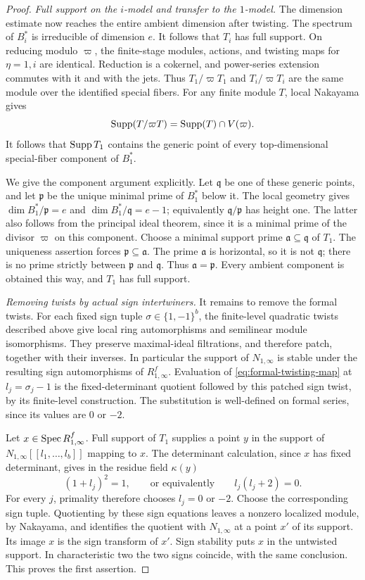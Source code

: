 \begin{proof}
\emph{Full support on the \(i\)-model and transfer to the \(1\)-model.}
The dimension estimate now reaches the entire ambient dimension after
twisting. The spectrum of $B_i^*$ is irreducible of dimension $e$.
It follows that $T_i$ has full support.  On reducing modulo
$\varpi$, the finite-stage modules, actions, and twisting maps
for $\eta=1,i$ are identical.  Reduction is a cokernel, and
power-series extension commutes with it and with the jets.
Thus $T_1/\varpi T_1$ and $T_i/\varpi T_i$ are the same
module over the identified special fibers.  For any finite
module $T$, local Nakayama gives
\[
 \operatorname{Supp}(T/\varpi T)=\operatorname{Supp}(T)\cap V(\varpi).
\]
It follows that $\operatorname{Supp} T_1$ contains the generic point of
every top-dimensional special-fiber component of $B_1^*$.

We give the component argument explicitly.  Let $\mathfrak q$
be one of these generic points, and let $\mathfrak p$ be the
unique minimal prime of $B_1^*$ below it.  The local geometry
gives $\dim B_1^*/\mathfrak p=e$ and
$\dim B_1^*/\mathfrak q=e-1$; equivalently
$\mathfrak q/\mathfrak p$ has height one.  The latter also
follows from the principal ideal theorem, since it is a
minimal prime of the divisor $\varpi$ on this component.
Choose a minimal support prime $\mathfrak a\subseteq\mathfrak q$
of $T_1$.  The uniqueness assertion forces
$\mathfrak p\subseteq\mathfrak a$.  The prime $\mathfrak a$
is horizontal, so it is not $\mathfrak q$; there is no prime
strictly between $\mathfrak p$ and $\mathfrak q$.
Thus $\mathfrak a=\mathfrak p$.  Every ambient component is
obtained this way, and $T_1$ has full support.

\emph{Removing twists by actual sign intertwiners.}
It remains to remove the formal twists.  For each fixed sign
tuple $\sigma\in\{1,-1\}^b$, the finite-level quadratic
twists described above give local ring automorphisms and
semilinear module isomorphisms.  They preserve maximal-ideal
filtrations, and therefore patch, together with their inverses.
In particular the support of $N_{1,\infty}$ is stable under
the resulting sign automorphisms of $R_{1,\infty}^f$.
Evaluation of \eqref{eq:formal-twisting-map} at
$l_j=\sigma_j-1$ is the fixed-determinant quotient followed by
this patched sign twist, by its finite-level construction.
The substitution is well-defined
on formal series, since its values are $0$ or $-2$.

Let $x\in\operatorname{Spec} R_{1,\infty}^f$.  Full support of $T_1$
supplies a point $y$ in the support of
$N_{1,\infty}[[l_1,\ldots,l_b]]$ mapping to $x$.
The determinant calculation, since $x$ has fixed determinant,
gives in the residue field $\kappa(y)$
\[
 (1+l_j)^2=1,\qquad\text{or equivalently}\qquad l_j(l_j+2)=0.
\]
For every $j$, primality therefore chooses $l_j=0$ or $-2$.
Choose the corresponding sign tuple.  Quotienting by these
sign equations leaves a nonzero localized module, by Nakayama,
and identifies the quotient with $N_{1,\infty}$ at a point
$x'$ of its support.  Its image $x$ is the sign transform of
$x'$.  Sign stability puts $x$ in the untwisted support.
In characteristic two the two signs coincide, with the same
conclusion.  This proves the first assertion.


\end{proof}
